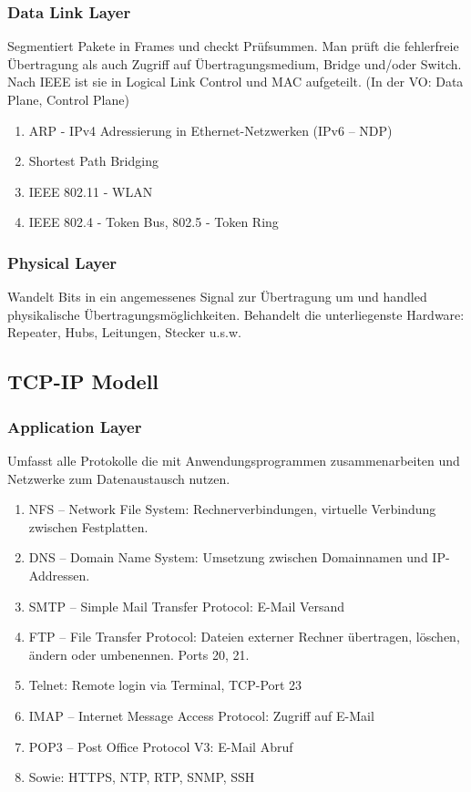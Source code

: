 \documentclass{article}
\begin{document}
    \subsubsection{ Data Link Layer}
    Segmentiert Pakete in Frames und checkt Prüfsummen. Man prüft die fehlerfreie Übertragung als auch Zugriff auf Übertragungsmedium, Bridge und/oder Switch. Nach IEEE ist sie in Logical Link Control und MAC aufgeteilt. (In der VO: Data Plane, Control Plane)
    \begin{enumerate}
        \item ARP - IPv4 Adressierung in Ethernet-Netzwerken (IPv6 -- NDP)
        \item Shortest Path Bridging
        \item IEEE 802.11 - WLAN
        \item IEEE 802.4 - Token Bus, 802.5 - Token Ring
    \end{enumerate}

    \subsubsection{Physical Layer}
    Wandelt Bits in ein angemessenes Signal zur Übertragung um und handled physikalische Übertragungsmöglichkeiten. Behandelt die unterliegenste Hardware: Repeater, Hubs, Leitungen, Stecker u.s.w.
    
    \subsection{TCP-IP Modell}
    \subsubsection{Application Layer}
    Umfasst alle Protokolle die mit Anwendungsprogrammen zusammenarbeiten und Netzwerke zum Datenaustausch nutzen.
    \begin{enumerate}
        \item NFS -- Network File System: Rechnerverbindungen, virtuelle Verbindung zwischen Festplatten.
        \item DNS -- Domain Name System: Umsetzung zwischen Domainnamen und IP-Addressen.
        \item SMTP -- Simple Mail Transfer Protocol: E-Mail Versand
        \item FTP -- File Transfer Protocol: Dateien externer Rechner übertragen, löschen, ändern oder umbenennen. Ports 20, 21.
        \item Telnet: Remote login via Terminal, TCP-Port 23
        \item IMAP -- Internet Message Access Protocol: Zugriff auf E-Mail
        \item POP3 -- Post Office Protocol V3: E-Mail Abruf
        \item Sowie: HTTPS, NTP, RTP, SNMP, SSH
    \end{enumerate}
    
\end{document}
